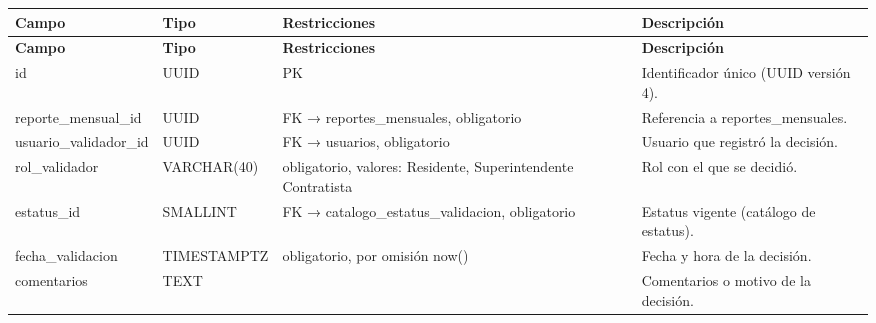 \begin{xltabular}{\linewidth}{@{}>{\ttfamily\footnotesize}p{4.9cm}>{\ttfamily\footnotesize}p{2.4cm}>{\raggedright\arraybackslash\footnotesize}p{3.3cm}>{\footnotesize}X@{}}
\toprule\normalfont\sffamily\bfseries\footnotesize Campo & \normalfont\sffamily\bfseries\footnotesize Tipo & \sffamily\bfseries Restricciones & \sffamily\bfseries Descripción\\\midrule\endfirsthead
\toprule\normalfont\sffamily\bfseries\footnotesize Campo & \normalfont\sffamily\bfseries\footnotesize Tipo & \sffamily\bfseries Restricciones & \sffamily\bfseries Descripción\\\midrule\endhead
\bottomrule\endfoot
id & UUID & PK & Identificador único (UUID versión 4).\\
reporte\_mensual\_id & UUID & FK → reportes\_mensuales, obligatorio & Referencia a reportes\_mensuales.\\
usuario\_validador\_id & UUID & FK → usuarios, obligatorio & Usuario que registró la decisión.\\
rol\_validador & VARCHAR(40) & obligatorio, valores: Residente, Superintendente Contratista & Rol con el que se decidió.\\
estatus\_id & SMALLINT & FK → catalogo\_estatus\_validacion, obligatorio & Estatus vigente (catálogo de estatus).\\
fecha\_validacion & TIMESTAMPTZ & obligatorio, por omisión now() & Fecha y hora de la decisión.\\
comentarios & TEXT &  & Comentarios o motivo de la decisión.\\
\end{xltabular}

